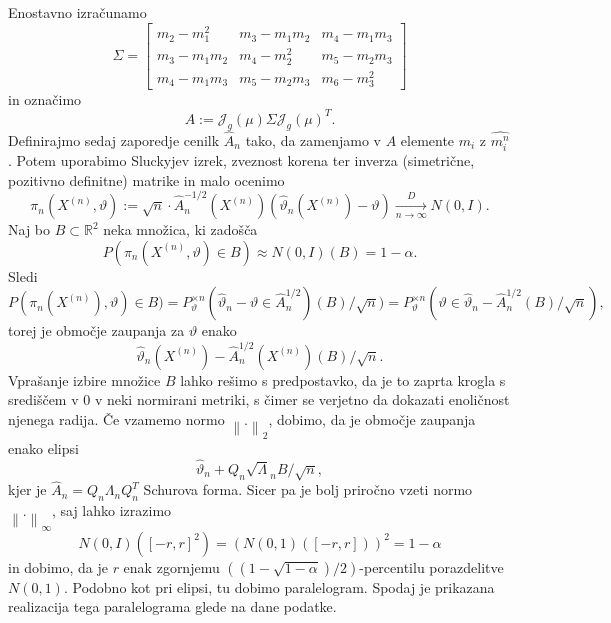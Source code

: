 \documentclass[ letterpaper, titlepage, fleqn]{article}
\newcommand{\R}{\mathbb R}
\newcommand{\J}{\mathscr J}
\newcommand{\norm}[1]{\left\lVert#1\right\rVert}
\begin{document}
\subsection{}
Enostavno izračunamo
$$\Sigma = 
\begin{bmatrix}
m_2 - m_1^2 & m_3 - m_1m_2 & m_4 - m_1m_3 \\
m_3 - m_1m_2 & m_4 - m_2^2 & m_5 - m_2m_3 \\
m_4 - m_1m_3 & m_5 - m_2m_3 & m_6 - m_3^2 
\end{bmatrix}
$$
in označimo
$$A := \J_g(\mu) \Sigma \J_g(\mu)^T.$$
Definirajmo sedaj zaporedje cenilk $\hat{A}_n$ tako, da zamenjamo v $A$  elemente $m_i$ z $\hat{m_i^n}$.
Potem uporabimo Sluckyjev izrek, zveznost korena ter inverza (simetrične, pozitivno definitne) matrike in malo ocenimo
$$\pi_n(X^{(n)}, \vartheta) := \sqrt{n} \cdot \hat{A}_n^{-1/2}(X^{(n)}) \left(\hat{\vartheta}_n(X^{(n)}) - \vartheta\right) \xrightarrow[n\to\infty]{D} N(0, I).$$
Naj bo $B \subset \R^2$ neka množica, ki zadošča
$$P(\pi_n(X^{(n)}, \vartheta) \in B) \approx N(0,I)(B) = 1 - \alpha.$$
Sledi
$$P(\pi_n(X^{(n)}), \vartheta) \in B) = P_{\vartheta}^{\times n}(\hat{\vartheta}_n - \vartheta \in \hat{A}_n^{1/2})\left(B\right) / \sqrt{n}) = P_{\vartheta}^{\times n}(\vartheta \in \hat{\vartheta}_n - \hat{A}_n^{1/2}\left(B\right) / \sqrt{n}),$$
torej je območje zaupanja za $\vartheta$ enako
$$\hat{\vartheta}_n(X^{(n)}) - \hat{A}_n^{1/2}(X^{(n)})\left(B\right) / \sqrt{n}.$$
Vprašanje izbire množice $B$ lahko rešimo s predpostavko, da je to zaprta krogla s središčem v $0$ v neki normirani metriki, 
s čimer se verjetno da dokazati enoličnost njenega radija. Če vzamemo normo $\norm{.}_2$, dobimo, da je območje zaupanja enako elipsi
$$\hat{\vartheta}_n + Q_n \sqrt{\Lambda}_n B / \sqrt{n},$$
kjer je $\hat{A}_n = Q_n \Lambda_n Q_n^T$ Schurova forma. Sicer pa je bolj priročno vzeti normo $\norm{.}_\infty$, saj lahko izrazimo 
\begin{equation*}
N(0,I)\left([-r,r]^2\right) = \left(N(0,1)([-r,r])\right)^2 = 1 - \alpha 
\end{equation*}
in dobimo, da je $r$ enak zgornjemu $((1 - \sqrt{1-\alpha})/2)$-percentilu porazdelitve $N(0,1)$. Podobno kot pri elipsi, tu dobimo paralelogram. Spodaj je prikazana realizacija tega paralelograma glede na dane podatke.
\end{document}
